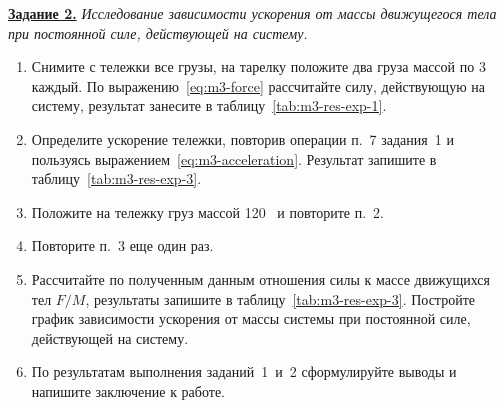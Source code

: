 \documentclass[a4paper, 12pt]{extarticle}
\begin{document}
\underline{\textbf{Задание 2.}} \emph{Исследование зависимости ускорения от массы движущегося тела при постоянной силе, действующей на систему.}
\begin{enumerate}
\item Снимите с тележки все грузы, на тарелку положите два груза массой по 3~ каждый. По выражению~\eqref{eq:m3-force} рассчитайте силу, действующую на систему, результат занесите в таблицу~\ref{tab:m3-res-exp-1}. 
\item Определите ускорение тележки, повторив операции п.~7 задания~1 и пользуясь выражением~\eqref{eq:m3-acceleration}. Результат запишите в таблицу~\ref{tab:m3-res-exp-3}. 
\item Положите на тележку груз массой 120~ и повторите п.~2.
\item Повторите п.~3 еще один раз.
\item Рассчитайте по полученным данным отношения силы к массе движущихся тел $F/M$, результаты запишите в таблицу~\ref{tab:m3-res-exp-3}. Постройте график зависимости ускорения от массы системы при постоянной силе, действующей на систему. %
\item По результатам выполнения заданий~1~и~2 сформулируйте выводы и напишите заключение к работе. 
\end{enumerate}
\end{document}

